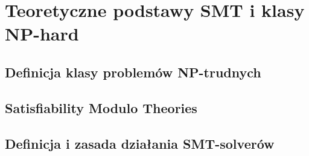 \chapter{Teoretyczne podstawy SMT i klasy NP-hard}

\section{Definicja klasy problemów NP-trudnych}

\section{Satisfiability Modulo Theories}

\section{Definicja i zasada działania SMT-solverów}



